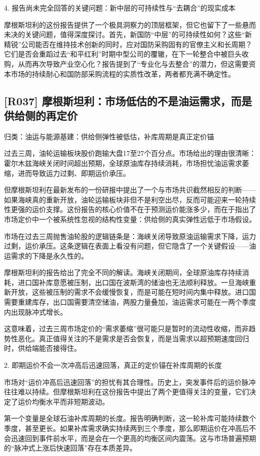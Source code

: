\documentclass[11pt]{ctexart}
\begin{document}
4. 报告尚未完全回答的关键问题：新中层的可持续性与“去耦合”的现实成本

摩根斯坦利的这份报告提供了一个极具洞察力的顶层框架，但它也留下了一些悬而未决的关键问题，值得深度探讨。首先，新国防“中层”的可持续性如何？这些“新精锐”公司能否在维持技术创新的同时，应对国防采购固有的官僚主义和长周期？它们是否会重蹈过去“和平红利”时期中型公司的覆辙，在下一轮整合中被巨头收购，从而再次导致产业空心化？报告提到了“专业化与去整合”的潜力，但这需要资本市场的持续耐心和国防部采购流程的实质性改革，两者都充满不确定性。

\subsection{[R037] 摩根斯坦利：市场低估的不是油运需求，而是供给侧的再定价}
{\small\color{refgray}归类：油运与能源基建：供给侧弹性被低估，补库周期是真正定价锚}

过去三周，油轮运输板块股价跑输大盘17至27个百分点。市场给出的理由很清晰：霍尔木兹海峡关闭时间超出预期，全球原油库存持续消耗，市场担忧油运需求萎缩，进而导致运力过剩、即期运价承压。

但摩根斯坦利在最新发布的一份研报中提出了一个与市场共识截然相反的判断——如果海峡真的重新开放，油轮运输板块非但不是利空出尽，反而可能迎来一轮持续性更强的运价支撑。这份报告的核心价值不在于预测运价能涨多少，而在于指出了市场定价中一个被系统性忽视的结构性变量：供给侧的真实弹性远低于市场假设。

市场在过去三周抛售油轮股的逻辑链条是：海峡关闭导致原油运输需求下降，运力过剩，运价承压。这条逻辑在表面上看没有问题，但它隐含了一个关键假设——油运需求的下降是永久性的。

摩根斯坦利的报告给出了完全不同的解读。海峡关闭期间，全球原油库存持续消耗，进口国补库意愿被压制，出口国在波斯湾的储油也无法顺利释放。一旦海峡重新开放，这些被压制的需求不会缓慢恢复，而是可能在短时间内集中释放。进口国需要重建库存，出口国需要清空储油，两股力量叠加，油运需求可能在一两个季度内出现脉冲式增长。

这意味着，过去三周市场定价的“需求萎缩”很可能只是暂时的流动性收缩，而非趋势性恶化。真正值得关注的不是需求是否会恢复，而是当需求以超预期速度回归时，供给端能否接得住。

2. 即期运价不会一次冲高后迅速回落，真正的定价锚在补库周期的长度

市场对“运价冲高后迅速回落”的担忧有其合理性。历史上，突发事件后的运价脉冲往往难以持续。但摩根斯坦利在这份报告中提出了两个更值得关注的变量，它们决定了运价均衡水平而非短期波动。

第一个变量是全球石油补库周期的长度。报告明确判断，这一轮补库可能持续数个季度，甚至更长。如果补库需求确实持续两到三个季度，那么即期运价在冲高后不会迅速回到事件前水平，而是会在一个更高的均衡区间内震荡。这与市场普遍预期的“脉冲式上涨后快速回落”存在本质差异。
\end{document}
